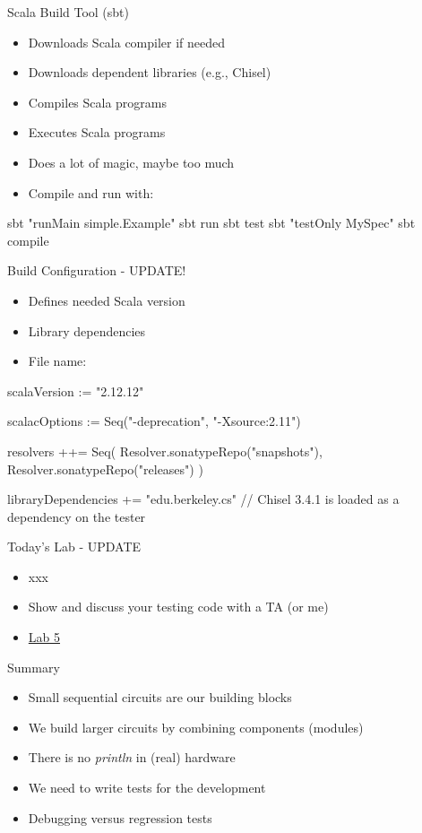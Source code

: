 \begin{frame}[fragile]{Scala Build Tool (sbt)}
\begin{itemize}
\item Downloads Scala compiler if needed
\item Downloads dependent libraries (e.g., Chisel)
\item Compiles Scala programs
\item Executes Scala programs
\item Does a lot of magic, maybe too much
\item Compile and run with:
\end{itemize}
\begin{chisel}
sbt "runMain simple.Example"
sbt run
sbt test
sbt "testOnly MySpec"
sbt compile
\end{chisel}
\end{frame}

\begin{frame}[fragile]{Build Configuration - UPDATE!}
\begin{itemize}
\item Defines needed Scala version
\item Library dependencies
\item File name: 
\end{itemize}
\begin{chisel}
scalaVersion := "2.12.12"

scalacOptions := Seq("-deprecation", "-Xsource:2.11")

resolvers ++= Seq(
  Resolver.sonatypeRepo("snapshots"),
  Resolver.sonatypeRepo("releases")
)

libraryDependencies += "edu.berkeley.cs" %
// Chisel 3.4.1 is loaded as a dependency on the tester
\end{chisel}
\end{frame}

\begin{frame}[fragile]{Today's Lab - UPDATE}
\begin{itemize}
\item xxx
\item Show and discuss your testing code with a TA (or me)
\item \href{https://github.com/schoeberl/chisel-lab/tree/master/lab5}{Lab 5}
\end{itemize}
\end{frame}

\begin{frame}[fragile]{Summary}
\begin{itemize}
\item Small sequential circuits are our building blocks
\item We build larger circuits by combining components (modules)
\item There is no \emph{println} in (real) hardware
\item We need to write tests for the development
\item Debugging versus regression tests
\end{itemize}
\end{frame}



